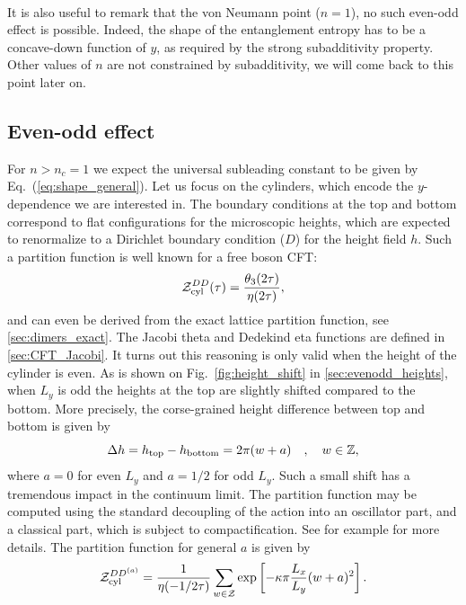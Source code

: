 \documentclass[11pt]{iopart}
\begin{document}
\paragraph{}
It is also useful to remark that the von Neumann point ($n=1$), no such even-odd effect is possible. Indeed, the shape of the entanglement entropy has to be a concave-down function of $y$, as required by the strong subadditivity property\cite{Strongsubadditivity}. Other values of $n$ are not constrained by subadditivity, we will come back to this point later on. 
\subsection{Even-odd effect}
\label{sec:evenodd}
For $n>n_c=1$ we expect the universal subleading constant to be given by Eq.~(\ref{eq:shape_general}). 
Let us focus on the cylinders, which encode the $y$-dependence we are interested in. The boundary conditions at the top and bottom correspond to flat configurations for the microscopic heights, which are expected to renormalize to a Dirichlet boundary condition ($D$) for the height field $h$. Such a partition function is well known for a free boson CFT\cite{FSW,EggertAffleck}:
\begin{equation}\label{eq:cyl_dd}
 \mathcal{Z}_{\rm cyl}^{DD}(\tau)=\frac{\theta_3(2\tau)}{\eta(2\tau)},
\end{equation}
and can even be derived from the exact lattice partition function, see \ref{sec:dimers_exact}. The Jacobi theta and Dedekind eta functions are defined in \ref{sec:CFT_Jacobi}. It turns out this reasoning is only valid when the height of the cylinder is even. As is shown on Fig.~\ref{fig:height_shift} in \ref{sec:evenodd_heights}, when $L_y$ is odd the heights at the top are slightly shifted compared to the bottom. 
More precisely, the corse-grained height difference between top and bottom is given by
\begin{equation}
 \Delta h =h_{\rm top}-h_{\rm bottom}=2\pi (w+a)\quad,\quad w \in \mathbb{Z},
\end{equation}
where $a=0$ for even $L_y$ and $a=1/2$ for odd $L_y$. 
Such a small shift has a tremendous impact in the continuum limit. The partition function may be computed using the standard decoupling of the action into an oscillator part, and a classical part, which is subject to compactification. See for example \cite{EggertAffleck,FSW,BigYellowBook} for more details. 
The partition function for general $a$ is given by
\begin{equation}
 \mathcal{Z}_{\rm cyl}^{DD^{(a)}}=\frac{1}{\eta(-1/2\tau)}\sum_{w \in \mathcal{Z}}\exp \left[-\kappa \pi\frac{L_x}{L_y} (w+a)^2\right].
\end{equation}
\end{document}
